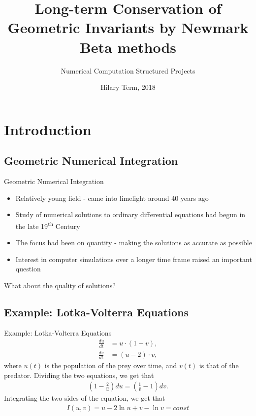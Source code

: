 \documentclass{beamer}
\title{Long-term Conservation of Geometric Invariants by Newmark Beta methods}
\subtitle{Numerical Computation Structured Projects}
\date{Hilary Term, 2018}
\begin{document}
{
\begin{frame}[noframenumbering]
	\titlepage
\end{frame}
}

\section{Introduction}
\subsection{Geometric Numerical Integration}
\begin{frame}{Geometric Numerical Integration}
	\begin{itemize}
		\item<1->
			Relatively young field - came into limelight around 40 years ago
		\item<1->
			Study of numerical solutions to ordinary differential equations had begun in the late 19\textsuperscript{th} Century
		\item<1->
			The focus had been on quantity - making the solutions as accurate as possible
		\item<1->
			Interest in computer simulations over a longer time frame raised an important question
	\end{itemize}
	 {\centering \alert{What about the quality of solutions?}}
\end{frame}

\subsection[Example]{Example: Lotka-Volterra Equations}
\begin{frame}{Example: Lotka-Volterra Equations}
\begin{align*}
	\frac{du}{dt} &= u\cdot(1-v),\\ 
	\frac{dv}{dt} &= (u-2)\cdot v,
\end{align*}
where $u(t)$ is the population of the prey over time, and $v(t)$ is that of the predator.
Dividing the two equations, we get that
\begin{align*}
\left(1 -  \frac{2}{u}\right) du = \left(\frac{1}{v} - 1\right) dv.
\end{align*}
Integrating the two sides of the equation, we get that
\begin{align*}
I(u, v) = u - 2\ln{u} +  v - \ln{v} = const
\end{align*}
\end{frame}
\end{document}
